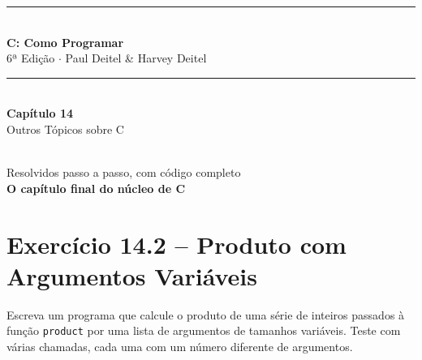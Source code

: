 \documentclass[12pt,a4paper]{article}
\begin{document}
\begin{titlepage}
  \centering\vspace*{2cm}
  {\color{deitelblue}\rule{\linewidth}{2pt}}\\[0.4cm]
  {\huge\bfseries\color{deitelblue}C: Como Programar}\\[0.2cm]
  {\large\color{deitelblue}6ª Edição $\cdot$ Paul Deitel \& Harvey Deitel}\\[0.2cm]
  {\color{deitelblue}\rule{\linewidth}{2pt}}\\[1cm]
  {\LARGE\bfseries Capítulo 14}\\[0.3cm]
  {\Large\color{deitelblue!80}Outros Tópicos sobre C}\\[0.8cm]
  \begin{tcolorbox}[colback=deitellightblue,colframe=deitelblue,width=0.85\linewidth]
    \\[0.2cm]
    {\normalsize Resolvidos passo a passo, com código completo\\[0.2cm]
    \textbf{O capítulo final do núcleo de C}}
  \end{tcolorbox}
\end{titlepage}

\tableofcontents\newpage

\section{Exercício 14.2 -- Produto com Argumentos Variáveis}

\begin{enunciadoBox}[Enunciado 14.2]
Escreva um programa que calcule o produto de uma série de inteiros passados à
função \texttt{product} por uma lista de argumentos de tamanhos variáveis.
Teste com várias chamadas, cada uma com um número diferente de argumentos.
\end{enunciadoBox}
\end{document}
